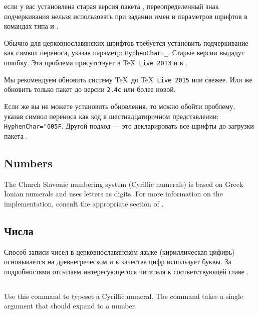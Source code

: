 \begin{RU}
 если у вас установлена старая версия пакета ,
переопределенный знак подчеркивания нельзя использовать при задании имен и параметров шрифтов в командах  типа
 и .

Обычно для церковнославянских шрифтов требуется установить подчеркивание как символ переноса, указав параметр:
\texttt{HyphenChar=_}. Старые версии  выдадут ошибку.
Эта проблема присутствует в \TeX\ \texttt{Live 2013} и в .

Мы рекомендуем обновить систему \TeX\ до \TeX\ \texttt{Live 2015} или свежее.
Или же обновить только пакет  до
версии \texttt{2.4c} или более новой.

Если же вы не можете установить обновления, то можно
обойти проблему, указав символ переноса как код в шестнадцатиричном представлении:
\texttt{HyphenChar="005F}. Другой подход --- это декларировать все шрифты до загрузки пакета .
\end{RU}

\begin{EN}
\section{Numbers}

The Church Slavonic numbering system (Cyrillic numerals)
is based on Greek Ionian numerals and uses letters as digits.
For more information on the implementation, consult the appropriate section of \cite{UN41}.
\end{EN}

\begin{RU}
\section{Числа}
Способ записи чисел в церковнославянском языке (кириллическая цифирь)
основывается на древнегреческом и в
качестве цифр использует буквы.
За подробностями отсылаем интересующегося читателя к
соответствующей главе \cite{UN41}.
\end{RU}

\begin{EN}
\subsection{}
Use this command to typeset a Cyrillic numeral.
The command takes a single argument that should expand to a number.
\end{EN}

